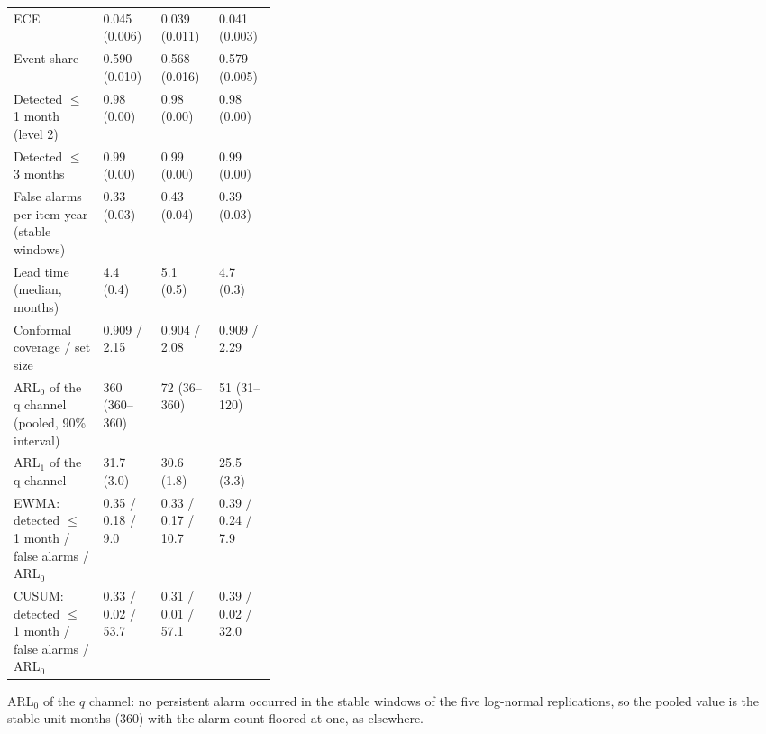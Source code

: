 \begin{minipage}{\linewidth}
\begin{tabular}{p{0.34\linewidth}lll}
ECE & 0.045 (0.006) & 0.039 (0.011) & 0.041 (0.003) \\
Event share & 0.590 (0.010) & 0.568 (0.016) & 0.579 (0.005) \\
Detected $\le$ 1 month (level 2) & 0.98 (0.00) & 0.98 (0.00) & 0.98 (0.00) \\
Detected $\le$ 3 months & 0.99 (0.00) & 0.99 (0.00) & 0.99 (0.00) \\
False alarms per item-year (stable windows) & 0.33 (0.03) & 0.43 (0.04) & 0.39 (0.03) \\
Lead time (median, months) & 4.4 (0.4) & 5.1 (0.5) & 4.7 (0.3) \\
Conformal coverage / set size & 0.909 / 2.15 & 0.904 / 2.08 & 0.909 / 2.29 \\
ARL$_0$ of the q channel (pooled, 90\% interval) & 360 (360–360) & 72 (36–360) & 51 (31–120) \\
ARL$_1$ of the q channel & 31.7 (3.0) & 30.6 (1.8) & 25.5 (3.3) \\
\midrule
EWMA: detected $\le$ 1 month / false alarms / ARL$_0$ & 0.35 / 0.18 / 9.0 & 0.33 / 0.17 / 10.7 & 0.39 / 0.24 / 7.9 \\
CUSUM: detected $\le$ 1 month / false alarms / ARL$_0$ & 0.33 / 0.02 / 53.7 & 0.31 / 0.01 / 57.1 & 0.39 / 0.02 / 32.0 \\
\bottomrule
\end{tabular}
\par\vspace{3pt}\begin{flushleft}\footnotesize ARL$_0$ of the $q$ channel: no persistent alarm occurred in the stable windows of the five log-normal replications, so the pooled value is the stable unit-months (360) with the alarm count floored at one, as elsewhere.\end{flushleft}
\end{minipage}
\vspace{22pt}


